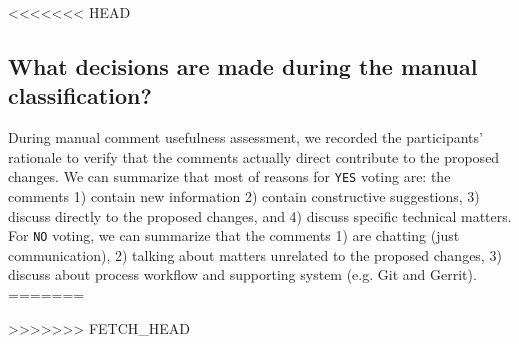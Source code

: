 <<<<<<< HEAD
\subsection{What decisions are made during the manual classification?}
During manual comment usefulness assessment, we recorded the participants' rationale to verify that the comments actually direct contribute to the proposed changes. We can summarize that most of reasons for \texttt{YES} voting are: the comments 1) contain new information 2) contain constructive suggestions, 3) discuss directly to the proposed changes, and 4) discuss specific technical matters. For \texttt{NO} voting, we can summarize that the comments 1) are chatting (just communication), 2) talking about matters unrelated to the proposed changes, 3) discuss about process workflow and supporting system (e.g. Git and Gerrit).
=======


>>>>>>> FETCH_HEAD
%
%
%

